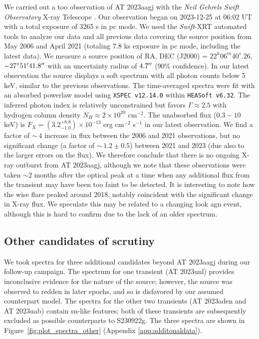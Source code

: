 \documentclass[twocolumn]{aastex631}
\newcommand{\gweventid}{S230922g\xspace}
\begin{document}
We carried out a \gls{too} observation of AT 2023aagj with the \textit{Neil Gehrels Swift Observatory} \citep{gehrelsSwiftGammaRayBurst2004} X-ray Telescope \citep[XRT;][]{burrowsSwiftXRayTelescope2005}.
Our observation began on 2023-12-25 at 06:02 UT with a total exposure of 3265 s in \gls{pc} mode. 
We used the \textit{Swift}-XRT automated tools \citep{Evans2009,Evans2023} to analyze our data and all previous data covering the source position from May 2006 and April 2021 (totaling 7.8 ks exposure in \gls{pc} mode, including the latest data). 
We measure a source position of RA, DEC (J2000) = $22^{h}06^m 40^{s}.26$, $-27^\circ 51\mbox{$^\prime$} 41.8\mbox{$^{\prime\prime}$}$ with an uncertainty radius of $4.7\mbox{$^{\prime\prime}$}$ (90\% confidence). 
In our latest observation the source displays a soft spectrum with all photon counts below 5 keV, similar to the previous observations.  
The time-averaged spectra were fit with an absorbed powerlaw model using \texttt{XSPEC v12.14.0} \citep{Arnaud1996} within \texttt{HEASoft v6.32}. 
The inferred photon index is relatively unconstrained but favors $\Gamma\approx2.5$ with hydrogen column density $N_H\approx2\times 10^{20}$ cm$^{-2}$. 
The unabsorbed flux ($0.3-10$ keV) is $F_X=(3.2^{+8.8}_{-1.0})\times10^{-13}$ erg cm$^{-2}$ s$^{-1}$ in our latest observation. 
We find a factor of $\sim$\,$4$ increase in flux between the 2006 and 2021 observations, but no significant change (a factor of $\sim$\,$1.2\pm0.5$) between 2021 and 2023 (due also to the larger errors on the flux). 
We therefore conclude that there is no ongoing X-ray outburst from AT 2023aagj, although we note that these observations were taken $\sim 2$ months after the optical peak at a time when any additional flux from the transient may have been too faint to be detected.
It is interesting to note how the \gls{wise} flare peaked around 2018, notably coincident with the significant change in X-ray flux. 
We speculate this may be related to a changing look \gls{agn} event, although this is hard to confirm due to the lack of an older spectrum.

\subsection{Other candidates of scrutiny}
\label{subsec:othercands}

We took spectra for three additional candidates beyond AT 2023aagj during our follow-up campaign.
The spectrum for one transient (AT 2023unl) provides inconclusive evidence for the nature of the source; however, the source was observed to redden in later epochs, and so is disfavored by our assumed counterpart model.
The spectra for the other two transients (AT 2023aden and AT 2023uab) contain \gls{sn}-like features; both of these transients are subsequently excluded as possible counterparts to \gweventid.
The three spectra are shown in Figure~\ref{fig:plot_spectra_other} (Appendix \ref{app:additonaldata}).
\end{document}
